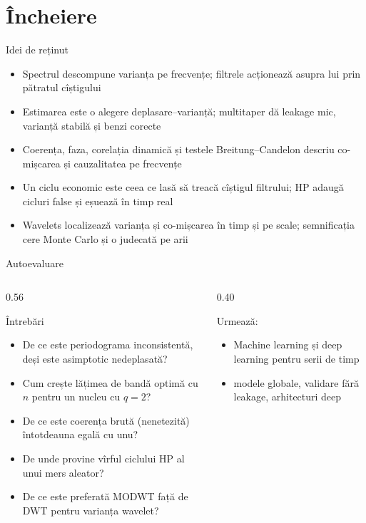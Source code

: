 \section{Încheiere}

\begin{frame}{Idei de reținut}
\itemsize{\small}
\begin{itemize}
    \item Spectrul descompune varianța pe frecvențe; filtrele acționează asupra lui prin pătratul cîștigului
    \item Estimarea este o alegere deplasare--varianță; multitaper dă leakage mic, varianță stabilă și benzi corecte
    \item Coerența, faza, corelația dinamică și testele Breitung--Candelon descriu co-mișcarea și cauzalitatea pe frecvențe
    \item Un ciclu economic este ceea ce lasă să treacă cîștigul filtrului; HP adaugă cicluri false și eșuează în timp real
    \item Wavelets localizează varianța și co-mișcarea în timp și pe scale; semnificația cere Monte Carlo și o judecată pe arii
\end{itemize}
\end{frame}

\begin{frame}{Autoevaluare}
\itemsize{\small}
\begin{columns}[T]
\begin{column}{0.56\textwidth}
\begin{block}{Întrebări}
\begin{itemize}
    \item De ce este periodograma inconsistentă, deși este asimptotic nedeplasată?
    \item Cum crește lățimea de bandă optimă cu $n$ pentru un nucleu cu $q = 2$?
    \item De ce este coerența brută (nenetezită) întotdeauna egală cu unu?
    \item De unde provine vîrful ciclului HP al unui mers aleator?
    \item De ce este preferată MODWT față de DWT pentru varianța wavelet?
\end{itemize}
\end{block}
\end{column}
\begin{column}{0.40\textwidth}
\begin{block}{Urmează: }
\begin{itemize}
    \item Machine learning și deep learning pentru serii de timp
    \item modele globale, validare fără leakage, arhitecturi deep
\end{itemize}
\end{block}
\end{column}
\end{columns}
\end{frame}


